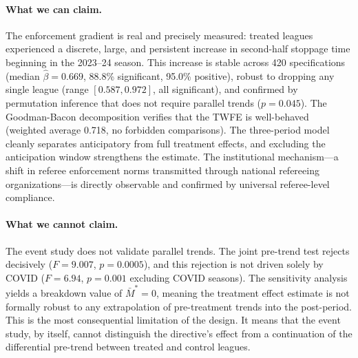 \paragraph{What we can claim.} The enforcement gradient is real and precisely measured: treated leagues experienced a discrete, large, and persistent increase in second-half stoppage time beginning in the 2023--24 season. This increase is stable across 420 specifications (median $\hat{\beta} = 0.669$, 88.8\% significant, 95.0\% positive), robust to dropping any single league (range $[0.587, 0.972]$, all significant), and confirmed by permutation inference that does not require parallel trends ($p = 0.045$). The Goodman-Bacon decomposition verifies that the TWFE is well-behaved (weighted average 0.718, no forbidden comparisons). The three-period model cleanly separates anticipatory from full treatment effects, and excluding the anticipation window strengthens the estimate. The institutional mechanism---a shift in referee enforcement norms transmitted through national refereeing organizations---is directly observable and confirmed by universal referee-level compliance.

\paragraph{What we cannot claim.} The event study does not validate parallel trends. The joint pre-trend test rejects decisively ($F = 9.007$, $p = 0.0005$), and this rejection is not driven solely by COVID ($F = 6.94$, $p = 0.001$ excluding COVID seasons). The \citet{roth2022pretest} sensitivity analysis yields a breakdown value of $\bar{M}^* = 0$, meaning the treatment effect estimate is not formally robust to any extrapolation of pre-treatment trends into the post-period. This is the most consequential limitation of the design. It means that the event study, by itself, cannot distinguish the directive's effect from a continuation of the differential pre-trend between treated and control leagues.


